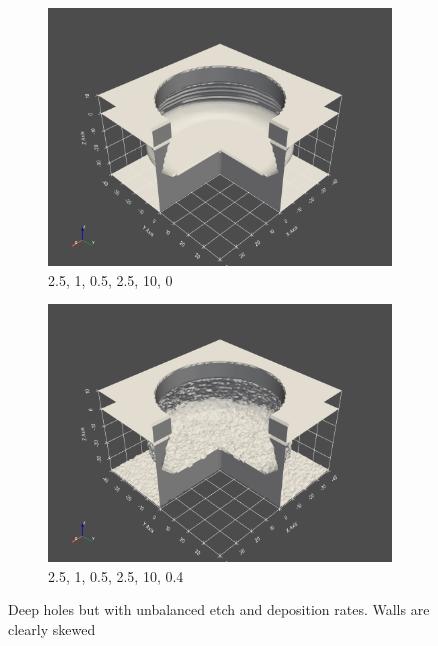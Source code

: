\begin{figure}[h]
    \begin{subfigure}{0.45\textwidth}
    \includegraphics[width=1\linewidth]{res/task2.2_uniformSkewed.png} 
    \caption{2.5, 1, 0.5, 2.5, 10, 0}
    
\end{subfigure}
    \begin{subfigure}{0.45\textwidth}
    \includegraphics[width=1\linewidth]{res/task2.2_randomSkewed.png}
    \caption{2.5, 1, 0.5, 2.5, 10, 0.4}
\end{subfigure}

\caption{Deep holes but with unbalanced etch and deposition rates. Walls are clearly skewed}
\end{figure}

